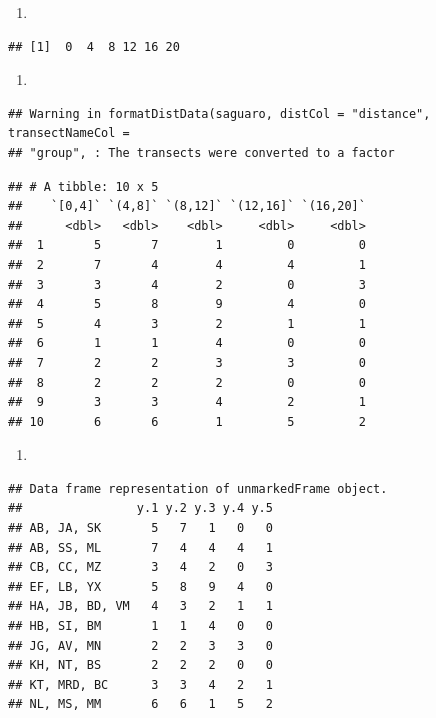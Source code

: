 \documentclass[
]{article}
\providecommand{\tightlist}{%
  \setlength{\itemsep}{0pt}\setlength{\parskip}{0pt}}
\begin{document}
\begin{enumerate}
\def\labelenumi{\arabic{enumi}.}
\setcounter{enumi}{4}
\tightlist
\item
\end{enumerate}

\begin{verbatim}
## [1]  0  4  8 12 16 20
\end{verbatim}

\begin{enumerate}
\def\labelenumi{\arabic{enumi}.}
\setcounter{enumi}{5}
\tightlist
\item
\end{enumerate}

\begin{verbatim}
## Warning in formatDistData(saguaro, distCol = "distance", transectNameCol =
## "group", : The transects were converted to a factor
\end{verbatim}

\begin{verbatim}
## # A tibble: 10 x 5
##    `[0,4]` `(4,8]` `(8,12]` `(12,16]` `(16,20]`
##      <dbl>   <dbl>    <dbl>     <dbl>     <dbl>
##  1       5       7        1         0         0
##  2       7       4        4         4         1
##  3       3       4        2         0         3
##  4       5       8        9         4         0
##  5       4       3        2         1         1
##  6       1       1        4         0         0
##  7       2       2        3         3         0
##  8       2       2        2         0         0
##  9       3       3        4         2         1
## 10       6       6        1         5         2
\end{verbatim}

\begin{enumerate}
\def\labelenumi{\arabic{enumi}.}
\setcounter{enumi}{6}
\tightlist
\item
\end{enumerate}

\begin{verbatim}
## Data frame representation of unmarkedFrame object.
##                y.1 y.2 y.3 y.4 y.5
## AB, JA, SK       5   7   1   0   0
## AB, SS, ML       7   4   4   4   1
## CB, CC, MZ       3   4   2   0   3
## EF, LB, YX       5   8   9   4   0
## HA, JB, BD, VM   4   3   2   1   1
## HB, SI, BM       1   1   4   0   0
## JG, AV, MN       2   2   3   3   0
## KH, NT, BS       2   2   2   0   0
## KT, MRD, BC      3   3   4   2   1
## NL, MS, MM       6   6   1   5   2
\end{verbatim}
\end{document}
